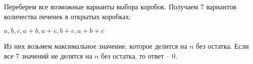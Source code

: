 \solutionSection

Переберем все возможные варианты выбора коробок.
Получаем 7 вариантов количества печенек в открытых коробках:

$a, b, c, a + b, a + c, b + c, a + b + c$

Из них возьмем максимальное значение, которое делится на $n$ без остатка.
Если все $7$ значений не делятся на $n$ без остатка, то ответ -- $0$.

\codeExample

